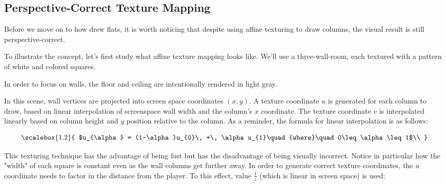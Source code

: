 \subsection{Perspective-Correct Texture Mapping}
Before we move on to how \doom{} drew flats, it is worth noticing that despite using affine texturing to draw columns, the visual result is still perspective-correct.\\
\par
 To illustrate the concept, let's first study what affine texture mapping looks like. We'll use a three-wall-room, each textured with a pattern of white and colored squares.\\
\par

\begin{minipage}{0.43\textwidth}
\end{minipage}
\hspace{20mm}
\begin{minipage}{0.4\textwidth}

  \label{affine_texture_examples}
 \end{minipage}
\par
\vspace{8pt}
In order to focus on walls, the floor and ceiling are intentionally rendered in light gray.\\
\par
{}
In this scene, wall vertices are projected into screen space coordinates $(x,y)$. A texture coordinate $u$ is generated for each column to draw, based on linear interpolation of screenspace wall width and the column's $x$ coordinate. The texture coordinate $v$ is interpolated linearly based on column height and $y$ position relative to the column. As a reminder, the formula for linear interpolation is as follows:\\
\par
\begin{equation*}
    \scalebox{1.2}{
$u_{\alpha} = (1-\alpha)u_{0}\, +\, \alpha u_{1}\quad{where}\quad0\leq \alpha \leq 1$\\
}
\end{equation*}
\vspace{3pt}
\par
This texturing technique has the advantage of being fast but has the disadvantage of being visually incorrect. Notice in particular how the "width" of each square is constant even as the wall columns get further away. In order to generate correct texture coordinates, the $u$ coordinate needs to factor in the distance from the player. To this effect, value $\frac{1}{z}$ (which is linear in screen space) is used:\\

